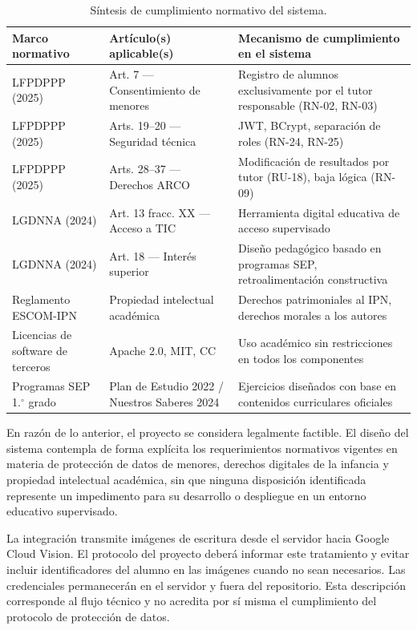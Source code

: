 \begin{table}[H]
\centering
\caption{Síntesis de cumplimiento normativo del sistema.}
\label{tab:cumplimiento_normativo}
\renewcommand{\arraystretch}{1.5}
\begin{tabular}{|>{\centering\arraybackslash}m{3.5cm}|>{\centering\arraybackslash}m{4.5cm}|>{\centering\arraybackslash}m{7cm}|}
\hline
\textbf{Marco normativo} & \textbf{Artículo(s) aplicable(s)} & \textbf{Mecanismo de cumplimiento en el sistema} \\ \hline
LFPDPPP (2025) & Art. 7 --- Consentimiento de menores & Registro de alumnos exclusivamente por el tutor responsable (RN-02, RN-03) \\ \hline
LFPDPPP (2025) & Arts. 19--20 --- Seguridad técnica & JWT, BCrypt, separación de roles (RN-24, RN-25) \\ \hline
LFPDPPP (2025) & Arts. 28--37 --- Derechos ARCO & Modificación de resultados por tutor (RU-18), baja lógica (RN-09) \\ \hline
LGDNNA (2024) & Art. 13 fracc. XX --- Acceso a TIC & Herramienta digital educativa de acceso supervisado \\ \hline
LGDNNA (2024) & Art. 18 --- Interés superior & Diseño pedagógico basado en programas SEP, retroalimentación constructiva \\ \hline
Reglamento ESCOM-IPN & Propiedad intelectual académica & Derechos patrimoniales al IPN, derechos morales a los autores \\ \hline
Licencias de software de terceros & Apache 2.0, MIT, CC & Uso académico sin restricciones en todos los componentes \\ \hline
Programas SEP 1.$^{\circ}$ grado & Plan de Estudio 2022 / Nuestros Saberes 2024 \cite{sep2024fase3, sep2024saberes1} & Ejercicios diseñados con base en contenidos curriculares oficiales \\ \hline
\end{tabular}
\end{table}

En razón de lo anterior, el proyecto se considera legalmente factible. El diseño del sistema contempla de forma explícita los requerimientos normativos vigentes en materia de protección de datos de menores, derechos digitales de la infancia y propiedad intelectual académica, sin que ninguna disposición identificada represente un impedimento para su desarrollo o despliegue en un entorno educativo supervisado.

\clearpage %
La integración transmite imágenes de escritura desde el servidor hacia Google Cloud Vision. El protocolo del proyecto deberá informar este tratamiento y evitar incluir identificadores del alumno en las imágenes cuando no sean necesarios. Las credenciales permanecerán en el servidor y fuera del repositorio. Esta descripción corresponde al flujo técnico y no acredita por sí misma el cumplimiento del protocolo de protección de datos.

